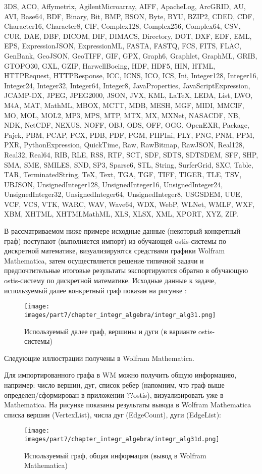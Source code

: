 3DS, ACO, Affymetrix, AgilentMicroarray, AIFF, ApacheLog, ArcGRID, AU, AVI, Base64, BDF, Binary, Bit, BMP, BSON, Byte, BYU, BZIP2, CDED, CDF, Character16, Character8, CIF, Complex128, Complex256, Complex64, CSV, CUR, DAE, DBF, DICOM, DIF, DIMACS, Directory, DOT, DXF, EDF, EML, EPS, ExpressionJSON, ExpressionML, FASTA, FASTQ, FCS, FITS, FLAC, GenBank, GeoJSON, GeoTIFF, GIF, GPX, Graph6, Graphlet, GraphML, GRIB, GTOPO30, GXL, GZIP, HarwellBoeing, HDF, HDF5, HIN, HTML, HTTPRequest, HTTPResponse, ICC, ICNS, ICO, ICS, Ini, Integer128, Integer16, Integer24, Integer32, Integer64, Integer8, JavaProperties, JavaScriptExpression, JCAMP-DX, JPEG, JPEG2000, JSON, JVX, KML, LaTeX, LEDA, List, LWO, M4A, MAT, MathML, MBOX, MCTT, MDB, MESH, MGF, MIDI, MMCIF, MO, MOL, MOL2, MP3, MPS, MTP, MTX, MX, MXNet, NASACDF, NB, NDK, NetCDF, NEXUS, NOFF, OBJ, ODS, OFF, OGG, OpenEXR, Package, Pajek, PBM, PCAP, PCX, PDB, PDF, PGM, PHPIni, PLY, PNG, PNM, PPM, PXR, PythonExpression, QuickTime, Raw, RawBitmap, RawJSON, Real128, Real32, Real64, RIB, RLE, RSS, RTF, SCT, SDF, SDTS, SDTSDEM, SFF, SHP, SMA, SME, SMILES, SND, SP3, Sparse6, STL, String, SurferGrid, SXC, Table, TAR, TerminatedString, TeX, Text, TGA, TGF, TIFF, TIGER, TLE, TSV, UBJSON, UnsignedInteger128, UnsignedInteger16, UnsignedInteger24, UnsignedInteger32, UnsignedInteger64, UnsignedInteger8, USGSDEM, UUE, VCF, VCS, VTK, WARC, WAV, Wave64, WDX, WebP, WLNet, WMLF, WXF, XBM, XHTML, XHTMLMathML, XLS, XLSX, XML, XPORT, XYZ, ZIP.

В рассматриваемом ниже примере исходные данные (некоторый конкретный граф) поступают (выполняется импорт) из обучающей ostis-системы по дискретной математике, визуализируются средствами графики Wolfram Mathematica, затем осуществляется решение типичной задачи и предпочтительные итоговые результаты экспортируются обратно в обучающую ostis-систему по дискретной математике. Исходные данные к задаче, используемый далее конкретный граф показан на рисунке \textit{}:

\begin{figure}[h]
	\centering
	\texttt{[image: images/part7/chapter\_integr\_algebra/integr\_alg31.png]}
	\caption{Используемый далее граф, вершины и дуги (в варианте ostis-системы)}
	\label{fig:integr_alg31}
\end{figure}


Следующие иллюстрации получены в Wolfram Mathematica. 

Для импортированного графа в WM можно получить общую информацию, например: число вершин, дуг, список ребер (напомним, что граф выше определен/сформирован в приложении ??ostis), визуализировать уже в Mathematica. На рисунке \textit{}
показаны результаты вывода в Wolfram Mathematica списка вершин (VertexList), числа дуг (EdgeCount), дуги (EdgeList):
\begin{figure}[h]
	\centering
	\texttt{[image: images/part7/chapter\_integr\_algebra/integr\_alg31d.png]}
	\caption{Используемый граф, общая информация (вывод в Wolfram Mathematica)}
	\label{fig:integr_alg31d}
\end{figure}

